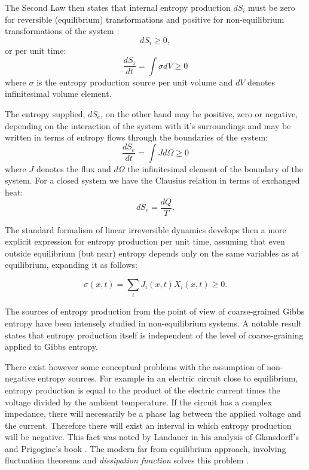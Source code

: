 \documentclass[a4paper,12pt]{article}
\begin{document}
The Second Law then states that internal entropy production $dS_i$ must be zero for reversible (equilibrium) transformations and positive for non-equilibrium transformations of the system \cite{DeGroot:2013ue}:
\begin{equation}
  dS_i \geq 0,
\end{equation}
or per unit time:
\begin{equation}
  	\frac{dS_i}{dt}=\int \sigma dV \geq 0
\end{equation}
where $\sigma$ is the entropy production source per unit volume and $dV$ denotes infinitesimal volume element.

The entropy supplied, $dS_e$, on the other hand may be positive, zero or negative, depending on the interaction of the system with it's surroundings and may be written in terms of entropy flows through the boundaries of the system:
\begin{equation}
  	\frac{dS_e}{dt}=\int J d\Omega \geq 0
\end{equation}
where $J$ denotes the flux and $d\Omega$ the infinitesimal element of the boundary of the system. For a closed system we have the Clausius relation in terms of exchanged heat:
\begin{equation}
  dS_e=\frac{dQ}{T}.
\end{equation}


The standard formalism of linear irreversible dynamics develops then a more explicit expression for entropy production per unit time, assuming that even outside equilibrium (but near) entropy depends only on the same variables as at equilibrium, expanding it as follows: 

\begin{equation}
  \sigma(x,t) = \sum_i J_i(x,t) X_i(x,t) \geq 0.
\end{equation}


The sources of entropy production from the point of view of coarse-grained Gibbs entropy have been intensely studied in non-equilibrium systems. A notable result \cite{Gilbert:1999ff, Goldstein:1998ip} states that entropy production itself is independent of the level of coarse-graining applied to Gibbs entropy.

There exist however some conceptual problems with the assumption of non-negative entropy sources.
For example in an electric circuit close to equilibrium, entropy production is equal to the product of the electric current times the voltage divided by the ambient temperature. If the circuit has a complex impedance, there will necessarily be a phase lag between the applied voltage and the current. Therefore there will exist an interval in which entropy production will be negative.
This fact was noted by Landauer in his analysis \cite{Landauer:pJ4RYJRG} of Glansdorff's and Prigogine's book \cite{Anonymous:NJxQY1gt}. The modern far from equilibrium approach, involving fluctuation theorems and \textit{dissipation function} solves this problem \cite{Evans:2241458}.
\end{document}
